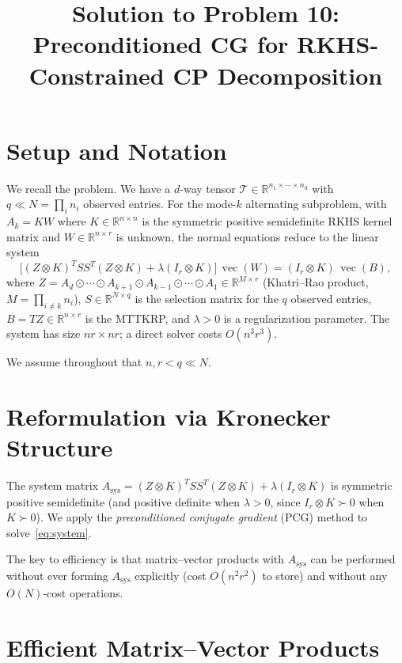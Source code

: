 \documentclass[11pt]{article}
\title{Solution to Problem 10:\\Preconditioned CG for RKHS-Constrained CP Decomposition}
\author{}
\date{}
\theoremstyle{definition}
\DeclareMathOperator{\vecop}{vec}
\newcommand{\R}{\mathbb{R}}
\newcommand{\T}{\mathcal{T}}
\begin{document}
\maketitle

\section*{Setup and Notation}

We recall the problem. We have a $d$-way tensor $\T \in \R^{n_1 \times \cdots \times n_d}$ with $q \ll N = \prod_i n_i$ observed entries. For the mode-$k$ alternating subproblem, with $A_k = KW$ where $K \in \R^{n \times n}$ is the symmetric positive semidefinite RKHS kernel matrix and $W \in \R^{n \times r}$ is unknown, the normal equations reduce to the linear system
\begin{equation}\label{eq:system}
  \bigl[(Z \otimes K)^T S S^T (Z \otimes K) + \lambda (I_r \otimes K)\bigr]\,\vecop(W)
  = (I_r \otimes K)\,\vecop(B),
\end{equation}
where $Z = A_d \odot \cdots \odot A_{k+1} \odot A_{k-1} \odot \cdots \odot A_1 \in \R^{M \times r}$ (Khatri--Rao product, $M = \prod_{i \neq k} n_i$), $S \in \R^{N \times q}$ is the selection matrix for the $q$ observed entries, $B = TZ \in \R^{n \times r}$ is the MTTKRP, and $\lambda > 0$ is a regularization parameter. The system has size $nr \times nr$; a direct solver costs $O(n^3 r^3)$.

We assume throughout that $n, r < q \ll N$.

\section{Reformulation via Kronecker Structure}

The system matrix $A_{\mathrm{sys}} = (Z \otimes K)^T S S^T (Z \otimes K) + \lambda (I_r \otimes K)$ is symmetric positive semidefinite (and positive definite when $\lambda > 0$, since $I_r \otimes K \succ 0$ when $K \succ 0$). We apply the \emph{preconditioned conjugate gradient} (PCG) method to solve~\eqref{eq:system}.

The key to efficiency is that matrix--vector products with $A_{\mathrm{sys}}$ can be performed without ever forming $A_{\mathrm{sys}}$ explicitly (cost $O(n^2 r^2)$ to store) and without any $O(N)$-cost operations.

\section{Efficient Matrix--Vector Products}
\end{document}
